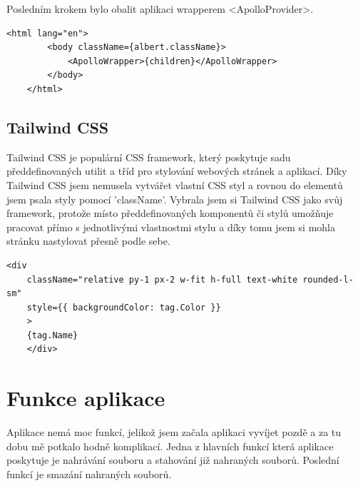 \documentclass[12pt, a4paper,
oneside,      %
openright
]{report}
\let\oldchapter\chapter
\renewcommand{\chapter}{
	\clearpage %
	\pagestyle{plain} %
	\oldchapter	
}
\begin{document}
Posledním krokem bylo obalit aplikaci wrapperem <ApolloProvider>.

\vspace{10pt}

\begin{lstlisting}[style=JavaScript, title={Kód}, caption={Ukázka komponentu <ApolloProvider> v client.js}] 
	<html lang="en">
		<body className={albert.className}>
			<ApolloWrapper>{children}</ApolloWrapper>
		</body>
	</html>
\end{lstlisting}


\section{Tailwind CSS}
Tailwind CSS je populární CSS framework, který poskytuje sadu předdefinovaných utilit a tříd pro stylování webových stránek a aplikací. Díky Tailwind CSS jsem nemusela vytvářet vlastní CSS styl a rovnou do elementů jsem psala styly pomocí 'className'. Vybrala jsem si Tailwind CSS jako svůj framework, protože místo předdefinovaných komponentů či stylů umožňuje pracovat přímo s jednotlivými vlastnostmi stylu a díky tomu jsem si mohla stránku nastylovat přesně podle sebe.

\vspace{10pt}

\begin{lstlisting}[style=JavaScript, title={Kód}, caption={Ukázka useState() v Collapsible.jsx}] 
	<div
	className="relative py-1 px-2 w-fit h-full text-white rounded-l-sm"
	style={{ backgroundColor: tag.Color }}
	>
	{tag.Name}
	</div>
\end{lstlisting}

\chapter{Funkce aplikace}
Aplikace nemá moc funkcí, jelikož jsem začala aplikaci vyvíjet pozdě a za tu dobu mě potkalo hodně komplikací. Jedna z hlavních funkcí která aplikace poskytuje je nahrávání souboru a stahování již nahraných souborů. Poslední funkcí je smazání nahraných souborů.
\end{document}
